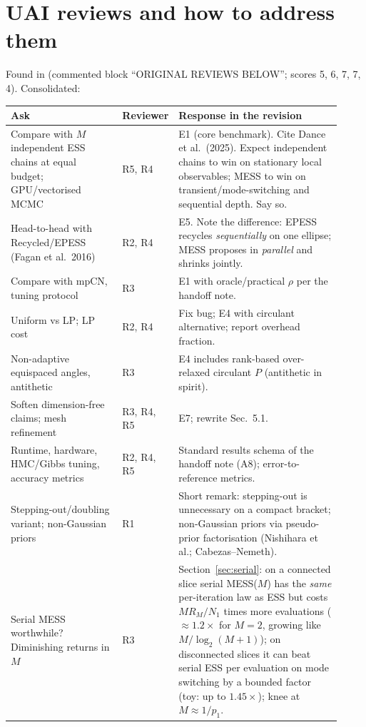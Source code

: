 \documentclass[11pt,a4paper]{article}
\theoremstyle{remark}
\begin{document}
\section{UAI reviews and how to address them}\label{sec:uai}
Found in  (commented block ``ORIGINAL REVIEWS BELOW''; scores 5, 6, 7, 7, 4). Consolidated:
\begin{center}\small
\begin{tabular}{@{}p{0.34\linewidth}p{0.08\linewidth}p{0.5\linewidth}@{}}
\toprule
Ask & Reviewer & Response in the revision \\
\midrule
Compare with $M$ independent ESS chains at equal budget; GPU/vectorised MCMC & R5, R4 & E1 (core benchmark). Cite Dance et al.\ (2025). Expect independent chains to win on stationary local observables; MESS to win on transient/mode-switching and sequential depth. Say so. \\
Head-to-head with Recycled/EPESS (Fagan et al.\ 2016) & R2, R4 & E5. Note the difference: EPESS recycles \emph{sequentially} on one ellipse; MESS proposes in \emph{parallel} and shrinks jointly. \\
Compare with mpCN, tuning protocol & R3 & E1 with oracle/practical $\rho$ per the handoff note. \\
Uniform vs LP; LP cost & R2, R4 & Fix bug; E4 with circulant alternative; report overhead fraction. \\
Non-adaptive equispaced angles, antithetic & R3 & E4 includes rank-based over-relaxed circulant $P$ (antithetic in spirit). \\
Soften dimension-free claims; mesh refinement & R3, R4, R5 & E7; rewrite Sec.~5.1. \\
Runtime, hardware, HMC/Gibbs tuning, accuracy metrics & R2, R4, R5 & Standard results schema of the handoff note (A8); error-to-reference metrics. \\
Stepping-out/doubling variant; non-Gaussian priors & R1 & Short remark: stepping-out is unnecessary on a compact bracket; non-Gaussian priors via pseudo-prior factorisation (Nishihara et al.; Cabezas--Nemeth). \\
Serial MESS worthwhile? Diminishing returns in $M$ & R3 & Section~\ref{sec:serial}: on a connected slice serial MESS($M$) has the \emph{same} per-iteration law as ESS but costs $MR_M/N_1$ times more evaluations ($\approx1.2\times$ for $M=2$, growing like $M/\log_2(M+1)$); on disconnected slices it can beat serial ESS per evaluation on mode switching by a bounded factor (toy: up to $1.45\times$); knee at $M\approx1/p_1$. \\
\bottomrule
\end{tabular}
\end{center}
\end{document}

